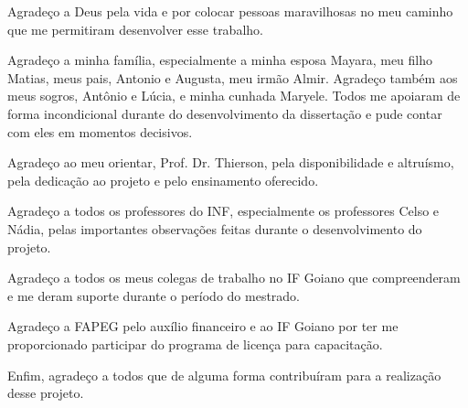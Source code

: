 \begin{agradecimentos}
Agrade\c co a Deus pela vida e por colocar pessoas maravilhosas no meu caminho que me permitiram desenvolver esse trabalho.

Agrade\c co a minha fam\'ilia, especialmente a minha esposa Mayara, meu filho Matias, meus pais, Antonio e Augusta, meu irm\~ao Almir. Agrade\c co tamb\'em aos meus sogros, Ant\^onio e L\'ucia, e minha cunhada Maryele. Todos me apoiaram de forma incondicional durante do desenvolvimento da disserta\c c\~ao e pude contar com eles em momentos decisivos.

Agrade\c co ao meu orientar, Prof. Dr. Thierson, pela disponibilidade e altru\'ismo, pela dedicação ao projeto e pelo ensinamento oferecido.

Agrade\c co a todos os professores do INF, especialmente os professores Celso e N\'adia, pelas importantes observa\c c\~oes feitas durante o desenvolvimento do projeto.

Agrade\c co a todos os meus colegas de trabalho no IF Goiano que compreenderam e me deram suporte durante o per\'iodo do mestrado.

Agrade\c co a FAPEG pelo aux\'ilio financeiro e ao IF Goiano por ter me proporcionado participar do programa de licen\c ca para capacita\c c\~ao.

Enfim, agrade\c co a todos que de alguma forma contribu\'iram para a realiza\c c\~ao desse projeto.
\end{agradecimentos}


